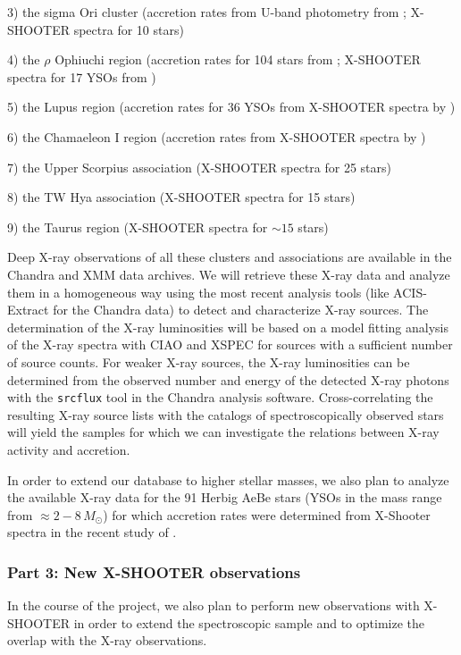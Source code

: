 \documentclass[10pt,fleqn,twoside]{article}
\newcommand{\Tcol}{\color{blue}}
\begin{document}
3) the sigma Ori cluster (accretion rates from U-band photometry from \citet{Rigliaco11};
X-SHOOTER spectra  for 10 stars)
\smallskip

4) the $\rho$ Ophiuchi region (accretion rates for 104 stars from \citet{Natta06};
X-SHOOTER spectra for 17 YSOs from \citet{Manara15})
\smallskip

5) the Lupus region (accretion rates for 36 YSOs from X-SHOOTER spectra by \citet{Alcala14})
\smallskip


6) the Chamaeleon I region (accretion rates from X-SHOOTER spectra by \citet{Manara16})
\smallskip

7) the Upper Scorpius association (X-SHOOTER spectra  for 25 stars)
\smallskip

8) the TW Hya association (X-SHOOTER spectra  for 15 stars)
\smallskip

9) the Taurus region (X-SHOOTER spectra  for $\sim 15$ stars)
\medskip



%
Deep X-ray observations of all these clusters and associations are available in the Chandra and XMM data
archives.  We will retrieve these X-ray data and analyze them in a homogeneous way
using the most recent analysis tools (like ACIS-Extract for the Chandra data) to detect
and characterize X-ray sources. The determination of the X-ray luminosities will be
based on a model fitting analysis of the X-ray spectra with CIAO and XSPEC for sources
with a sufficient number of source counts. For weaker X-ray sources, 
the  X-ray luminosities can be determined from the observed number and energy of the 
detected X-ray photons with the {\tt srcflux} tool in the Chandra analysis software.
Cross-correlating the resulting X-ray source lists with the catalogs of spectroscopically
observed stars will yield the samples for which we can investigate the relations between
X-ray activity and accretion.
\smallskip


In order to extend our database to higher stellar masses, we also plan to analyze 
the available X-ray data for the 91 Herbig AeBe stars (YSOs in the mass range from 
$\approx 2 - 8\,M_\odot$) for which 
accretion rates were determined from X-Shooter spectra in 
the recent study of \citet{Fairlamb16}.


\subsubsection*{\Tcol Part 3:  New X-SHOOTER observations}

In the course of the project, we also plan to perform new
observations with X-SHOOTER in order to extend the
spectroscopic sample and to optimize the overlap with the X-ray observations.
\end{document}
